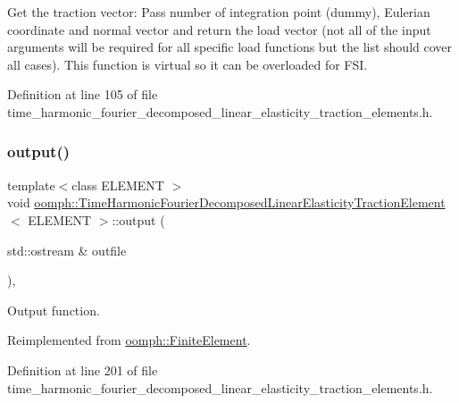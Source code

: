 Get the traction vector\+: Pass number of integration point (dummy), Eulerian coordinate and normal vector and return the load vector (not all of the input arguments will be required for all specific load functions but the list should cover all cases). This function is virtual so it can be overloaded for F\+SI. 



Definition at line 105 of file time\+\_\+harmonic\+\_\+fourier\+\_\+decomposed\+\_\+linear\+\_\+elasticity\+\_\+traction\+\_\+elements.\+h.

\mbox{\label{classoomph_1_1TimeHarmonicFourierDecomposedLinearElasticityTractionElement_a7e87380d0f0d36bb37e2062574f09c05}} 
\subsubsection{\texorpdfstring{output()}{output()}\hspace{0.1cm}{\footnotesize\ttfamily [1/4]}}
{\footnotesize\ttfamily template$<$class E\+L\+E\+M\+E\+NT $>$ \\
void \hyperlink{classoomph_1_1TimeHarmonicFourierDecomposedLinearElasticityTractionElement}{oomph\+::\+Time\+Harmonic\+Fourier\+Decomposed\+Linear\+Elasticity\+Traction\+Element}$<$ E\+L\+E\+M\+E\+NT $>$\+::output (\begin{DoxyParamCaption}\item[{std\+::ostream \&}]{outfile }\end{DoxyParamCaption})\hspace{0.3cm}{\ttfamily [inline]}, {\ttfamily [virtual]}}



Output function. 



Reimplemented from \hyperlink{classoomph_1_1FiniteElement_a2ad98a3d2ef4999f1bef62c0ff13f2a7}{oomph\+::\+Finite\+Element}.



Definition at line 201 of file time\+\_\+harmonic\+\_\+fourier\+\_\+decomposed\+\_\+linear\+\_\+elasticity\+\_\+traction\+\_\+elements.\+h.



